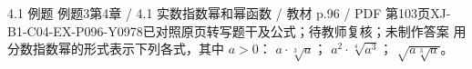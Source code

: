 \par\noindent\begin{minipage}{\linewidth}
\begin{bankitem}{4.1 例题 例题3}{第4章 / 4.1 实数指数幂和幂函数 / 教材 p.96 / PDF 第103页}{XJ-B1-C04-EX-P096-Y0978}{已对照原页转写题干及公式；待教师复核；未制作答案}
用分数指数幂的形式表示下列各式，其中 $a>0$：
$a\cdot\sqrt[3]a$；
$a^2\cdot\sqrt[4]{a^3}$；
$\sqrt{a\sqrt[3]a}$。
\end{bankitem}
\end{minipage}\par\medskip
